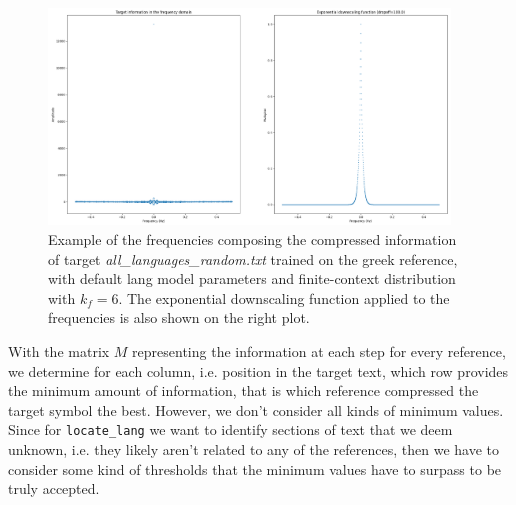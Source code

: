 \documentclass{article}
\begin{document}
\begin{figure}
    \centering
    \includegraphics[width=0.95\textwidth]{./images/low_pass_filter.png}
    \caption{Example of the frequencies composing the compressed information of target \textit{all\_languages\_random.txt} trained on the greek reference, with default lang model parameters and finite-context distribution with $k_f=6$. The exponential downscaling function applied to the frequencies is also shown on the right plot.}
    \label{fig:low_pass_filter}
\end{figure}

With the matrix $M$ representing the information at each step for every reference, we determine for each column, i.e. position in the target text, which row provides the minimum amount of information, that is which reference compressed the target symbol the best.
However, we don't consider all kinds of minimum values.
Since for \verb|locate_lang| we want to identify sections of text that we deem unknown, i.e. they likely aren't related to any of the references, then we have to consider some kind of thresholds that the minimum values have to surpass to be truly accepted.
\end{document}
